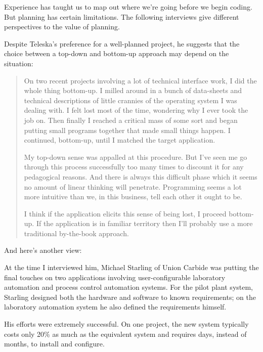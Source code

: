\noindent Experience has taught us to map out where we're going before we begin
coding. But planning has certain limitations. The following interviews
give different perspectives to the value of planning.

\blackline{2ex}
\noindent Despite Teleska's preference for a well-planned project, he suggests that
the choice between a top-down and bottom-up approach may depend on
the situation:

\begin{quotation}
\noindent On two recent projects involving a lot of technical interface work, I did the
whole thing bottom-up. I milled around in a bunch of data-sheets and
technical descriptions of little crannies of the operating system I was
dealing with. I felt lost most of the time, wondering why I ever took the job on.
Then finally I reached a critical mass of some sort and began putting small
programs together that made small things happen. I continued, bottom-up,
until I matched the target application.

\noindent My top-down sense was appalled at this procedure. But I've seen me go
through this process successfully too many times to discount it for any
pedagogical reasons. And there is always this difficult phase which it seems
no amount of linear thinking will penetrate. Programming seems a lot more
intuitive than we, in this business, tell each other it ought to be.

\noindent I think if the application elicits this sense of being lost, I proceed
bottom-up. If the application is in familiar territory then I'll probably
use a more traditional by-the-book approach.
\end{quotation}
\blackline{2ex}


\noindent And here's another view:

\blackline{2ex}
\noindent At the time I interviewed him, Michael Starling of Union Carbide was
putting the final touches on two applications involving user-configurable
laboratory automation and process control automation systems. For the
pilot plant system, Starling designed both the hardware and software to
known requirements; on the laboratory automation system he also
defined the requirements himself.

His efforts were extremely successful. On one project, the new
system typically costs only 20\% as much as the equivalent system and
requires days, instead of months, to install and configure.

